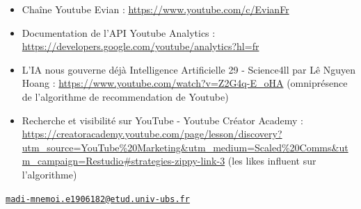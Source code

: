 \begin{itemize}
\tightlist
\item
  Chaîne Youtube Evian : \url{https://www.youtube.com/c/EvianFr}
\item
  Documentation de l'API Youtube Analytics :
  \url{https://developers.google.com/youtube/analytics?hl=fr}
\item
  L'IA nous gouverne déjà \textbar{} Intelligence Artificielle 29 -
  Science4ll par Lê Nguyen Hoang :
  \url{https://www.youtube.com/watch?v=Z2G4q-E_oHA} (omniprésence de
  l'algorithme de recommendation de Youtube)
\item
  Recherche et visibilité sur YouTube - Youtube Créator Academy :
  \url{https://creatoracademy.youtube.com/page/lesson/discovery?utm_source=YouTube\%20Marketing\&utm_medium=Scaled\%20Comms\&utm_campaign=Restudio\#strategies-zippy-link-3}
  (les likes influent sur l'algorithme)
\end{itemize}


\address{%
Charles-Meldhine MADI MNEMOI\\
Université de Bretagne-Sud, L2 MIS\\
\\
}
\href{mailto:madi-mnemoi.e1906182@etud.univ-ubs.fr}{\nolinkurl{madi-mnemoi.e1906182@etud.univ-ubs.fr}}

